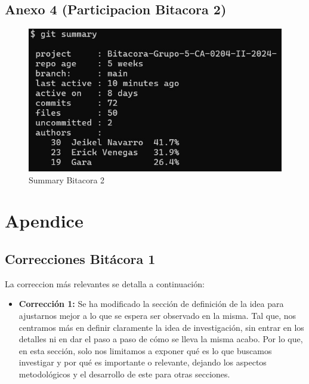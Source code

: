 \documentclass[
  letterpaper,
  DIV=11,
  numbers=noendperiod]{scrreprt}
\providecommand{\tightlist}{%
  \setlength{\itemsep}{0pt}\setlength{\parskip}{0pt}}\usepackage{longtable,booktabs,array}
\begin{document}
\section{Anexo 4 (Participacion Bitacora
2)}\label{anexo-4-participacion-bitacora-2}

\begin{figure}[H]

{\centering \includegraphics{imagenes/summary_2.jpeg}

}

\caption{Summary Bitacora 2}

\end{figure}%


\chapter{Apendice}\label{apendice}

\section{Correcciones Bitácora 1}\label{correcciones-bituxe1cora-1}

La correccion más relevantes se detalla a continuación:

\begin{itemize}
\tightlist
\item
  \textbf{Corrección 1:} Se ha modificado la sección de definición de la
  idea para ajustarnos mejor a lo que se espera ser observado en la
  misma. Tal que, nos centramos más en definir claramente la idea de
  investigación, sin entrar en los detalles ni en dar el paso a paso de
  cómo se lleva la misma acabo. Por lo que, en esta sección, solo nos
  limitamos a exponer qué es lo que buscamos investigar y por qué es
  importante o relevante, dejando los aspectos metodológicos y el
  desarrollo de este para otras secciones.
\end{itemize}
\end{document}
